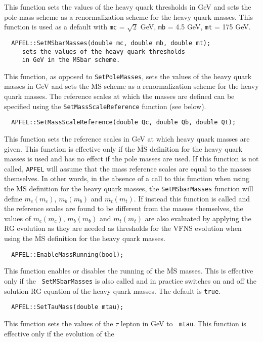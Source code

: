 \documentclass[11pt,a4paper]{article}
\begin{document}
This function sets the values of the heavy quark thresholds in GeV and
sets the pole-mass scheme as a renormalization scheme for the heavy
quark masses. This function is used as a default with {\tt mc} =
$\sqrt{2}$ GeV, {\tt mb} = 4.5 GeV, {\tt mt} = 175 GeV.
\begin{lstlisting}
  APFEL::SetMSbarMasses(double mc, double mb, double mt);
     sets the values of the heavy quark thresholds
     in GeV in the MSbar scheme.
\end{lstlisting}
This function, as opposed to {\tt SetPoleMasses}, sets the values of
the heavy quark masses in GeV and sets the $\overline{\mbox{MS}}$
scheme as a renormalization scheme for the heavy quark masses. The
reference scales at which the masses are defined can be specified
using the {\tt SetMassScaleReference} function (see below).
\begin{lstlisting}
  APFEL::SetMassScaleReference(double Qc, double Qb, double Qt);
\end{lstlisting}
This function sets the reference scales in GeV at which heavy quark
masses are given. This function is effective only if the
$\overline{\mbox{MS}}$ definition for the heavy quark masses is used
and has no effect if the pole masses are used. If this function is not
called, {\tt APFEL} will assume that the mass reference scales are
equal to the masses themselves. In other words, in the absence of a
call to this function when using the $\overline{\mbox{MS}}$ definition
for the heavy quark masses, the {\tt SetMSbarMasses} function will
define $m_c(m_c)$, $m_b(m_b)$ and $m_t(m_t)$. If instead this function
is called and the reference scales are found to be different from the
masses themselves, the values of $m_c(m_c)$, $m_b(m_b)$ and $m_t(m_t)$
are also evaluated by applying the RG evolution as they are needed as
thresholds for the VFNS evolution when using the
$\overline{\mbox{MS}}$ definition for the heavy quark masses.
\begin{lstlisting}
  APFEL::EnableMassRunning(bool);
\end{lstlisting}
This function enables or disables the running of the
$\overline{\mbox{MS}}$ masses.  This is effective only if the {\tt
  SetMSbarMasses} is also called and in practice switches on and off
the solution RG equation of the heavy quark masses. The default is
{\tt true}.
\begin{lstlisting}
  APFEL::SetTauMass(double mtau);
\end{lstlisting}
This function sets the values of the $\tau$ lepton in GeV to {\tt
  mtau}. This function is effective only if the evolution of the
\end{document}
